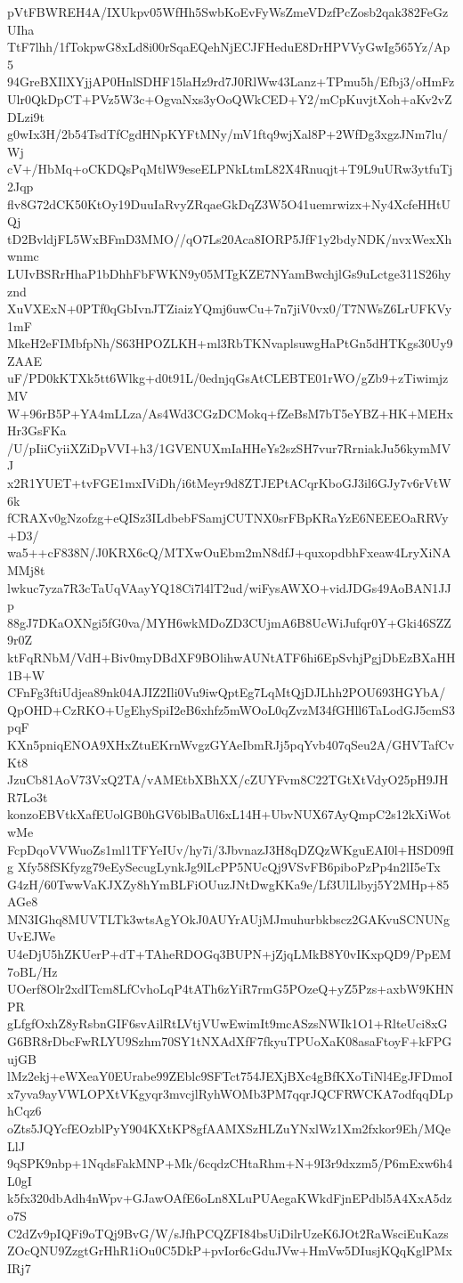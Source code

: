 pVtFBWREH4A/IXUkpv05WfHh5SwbKoEvFyWsZmeVDzfPcZosb2qak382FeGzUIha
TtF7lhh/1fTokpwG8xLd8i00rSqaEQehNjECJFHeduE8DrHPVVyGwIg565Yz/Ap5
94GreBXIlXYjjAP0HnlSDHF15laHz9rd7J0RlWw43Lanz+TPmu5h/Efbj3/oHmFz
Ulr0QkDpCT+PVz5W3c+OgvaNxs3yOoQWkCED+Y2/mCpKuvjtXoh+aKv2vZDLzi9t
g0wIx3H/2b54TsdTfCgdHNpKYFtMNy/mV1ftq9wjXal8P+2WfDg3xgzJNm7lu/Wj
cV+/HbMq+oCKDQsPqMtlW9eseELPNkLtmL82X4Rnuqjt+T9L9uURw3ytfuTj2Jqp
flv8G72dCK50KtOy19DuuIaRvyZRqaeGkDqZ3W5O41uemrwizx+Ny4XcfeHHtUQj
tD2BvldjFL5WxBFmD3MMO//qO7Ls20Aca8IORP5JfF1y2bdyNDK/nvxWexXhwnmc
LUIvBSRrHhaP1bDhhFbFWKN9y05MTgKZE7NYamBwchjlGs9uLctge311S26hyznd
XuVXExN+0PTf0qGbIvnJTZiaizYQmj6uwCu+7n7jiV0vx0/T7NWsZ6LrUFKVy1mF
MkeH2eFIMbfpNh/S63HPOZLKH+ml3RbTKNvaplsuwgHaPtGn5dHTKgs30Uy9ZAAE
uF/PD0kKTXk5tt6Wlkg+d0t91L/0ednjqGsAtCLEBTE01rWO/gZb9+zTiwimjzMV
W+96rB5P+YA4mLLza/As4Wd3CGzDCMokq+fZeBsM7bT5eYBZ+HK+MEHxHr3GsFKa
/U/pIiiCyiiXZiDpVVI+h3/1GVENUXmIaHHeYs2szSH7vur7RrniakJu56kymMVJ
x2R1YUET+tvFGE1mxIViDh/i6tMeyr9d8ZTJEPtACqrKboGJ3il6GJy7v6rVtW6k
fCRAXv0gNzofzg+eQISz3ILdbebFSamjCUTNX0srFBpKRaYzE6NEEEOaRRVy+D3/
wa5++cF838N/J0KRX6cQ/MTXwOuEbm2mN8dfJ+quxopdbhFxeaw4LryXiNAMMj8t
lwkuc7yza7R3cTaUqVAayYQ18Ci7l4lT2ud/wiFysAWXO+vidJDGs49AoBAN1JJp
88gJ7DKaOXNgi5fG0va/MYH6wkMDoZD3CUjmA6B8UcWiJufqr0Y+Gki46SZZ9r0Z
ktFqRNbM/VdH+Biv0myDBdXF9BOlihwAUNtATF6hi6EpSvhjPgjDbEzBXaHH1B+W
CFnFg3ftiUdjea89nk04AJIZ2Ili0Vu9iwQptEg7LqMtQjDJLhh2POU693HGYbA/
QpOHD+CzRKO+UgEhySpiI2eB6xhfz5mWOoL0qZvzM34fGHll6TaLodGJ5cmS3pqF
KXn5pniqENOA9XHxZtuEKrnWvgzGYAeIbmRJj5pqYvb407qSeu2A/GHVTafCvKt8
JzuCb81AoV73VxQ2TA/vAMEtbXBhXX/cZUYFvm8C22TGtXtVdyO25pH9JHR7Lo3t
konzoEBVtkXafEUolGB0hGV6blBaUl6xL14H+UbvNUX67AyQmpC2s12kXiWotwMe
FcpDqoVVWuoZs1ml1TFYeIUv/hy7i/3JbvnazJ3H8qDZQzWKguEAI0l+HSD09fIg
Xfy58fSKfyzg79eEySecugLynkJg9lLcPP5NUcQj9VSvFB6piboPzPp4n2lI5eTx
G4zH/60TwwVaKJXZy8hYmBLFiOUuzJNtDwgKKa9e/Lf3UlLlbyj5Y2MHp+85AGe8
MN3IGhq8MUVTLTk3wtsAgYOkJ0AUYrAUjMJmuhurbkbscz2GAKvuSCNUNgUvEJWe
U4eDjU5hZKUerP+dT+TAheRDOGq3BUPN+jZjqLMkB8Y0vIKxpQD9/PpEM7oBL/Hz
UOerf8Olr2xdITcm8LfCvhoLqP4tATh6zYiR7rmG5POzeQ+yZ5Pzs+axbW9KHNPR
gLfgfOxhZ8yRsbnGIF6svAilRtLVtjVUwEwimIt9mcASzsNWIk1O1+RlteUci8xG
G6BR8rDbcFwRLYU9Szhm70SY1tNXAdXfF7fkyuTPUoXaK08asaFtoyF+kFPGujGB
lMz2ekj+eWXeaY0EUrabe99ZEblc9SFTct754JEXjBXc4gBfKXoTiNl4EgJFDmoI
x7yva9ayVWLOPXtVKgyqr3mvcjlRyhWOMb3PM7qqrJQCFRWCKA7odfqqDLphCqz6
oZts5JQYcfEOzblPyY904KXtKP8gfAAMXSzHLZuYNxlWz1Xm2fxkor9Eh/MQeLlJ
9qSPK9nbp+1NqdsFakMNP+Mk/6cqdzCHtaRhm+N+9I3r9dxzm5/P6mExw6h4L0gI
k5fx320dbAdh4nWpv+GJawOAfE6oLn8XLuPUAegaKWkdFjnEPdbl5A4XxA5dzo7S
C2dZv9pIQFi9oTQj9BvG/W/sJfhPCQZFI84bsUiDilrUzeK6JOt2RaWsciEuKazs
ZOcQNU9ZzgtGrHhR1iOu0C5DkP+pvIor6cGduJVw+HmVw5DIusjKQqKglPMxIRj7
